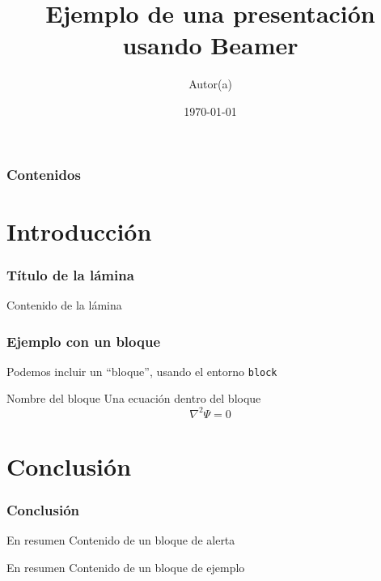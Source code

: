 \documentclass[colorlinks,aspectratio=169]{beamer}
\begin{document}
\title{Ejemplo de una presentación usando Beamer}
\author[iniciales de autor(a)]{Autor(a)} 
\date{\today}
\frame{\titlepage}

\begin{frame}
\frametitle{Contenidos}
\tableofcontents
\end{frame}

\section{Introducción}
\begin{frame}\frametitle{Título de la lámina}
Contenido de la lámina
\end{frame}

\begin{frame}\frametitle{Ejemplo con un bloque}
Podemos incluir un ``bloque'', usando el entorno \texttt{block}
\begin{block}{Nombre del bloque}
Una ecuación dentro del bloque
\begin{equation}
\nabla^2\Psi=0
\end{equation}
\end{block}
\end{frame}

\section{Conclusión}

\begin{frame}
\frametitle{Conclusión}
\begin{alertblock}{En resumen}
Contenido de un bloque de alerta
\end{alertblock}

\begin{exampleblock}{En resumen}
Contenido de un bloque de ejemplo
\end{exampleblock}
\end{frame}
\end{document}
